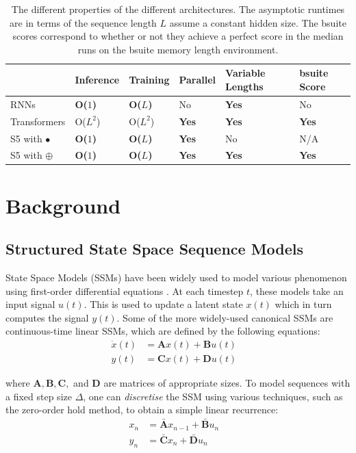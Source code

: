 \documentclass{article}
\newcommand{\oldop}{\bullet}
\newcommand{\newop}{\oplus}
\begin{document}
\begin{table}[t]
\centering
\begin{tabular}{l|lllll}
               & Inference     & Training      & Parallel     & Variable Lengths & bsuite Score \\ \hline
RNNs           & \textbf{O($1$)} & \textbf{O($L$)} & No           & \textbf{Yes}     & No           \\
Transformers   & O($L^2$)         & O($L^2$)         & \textbf{Yes} & \textbf{Yes}     & \textbf{Yes} \\
S5 with $\oldop$  & \textbf{O($1$)} & \textbf{O($L$)} & \textbf{Yes} & No               & N/A          \\
S5 with $\newop$ & \textbf{O($1$)} & \textbf{O($L$)} & \textbf{Yes} & \textbf{Yes}     & \textbf{Yes}
\end{tabular}
\vspace{1em}
\caption{The different properties of the different architectures. The asymptotic runtimes are in terms of the sequence length $L$ assume a constant hidden size. The bsuite scores correspond to whether or not they achieve a perfect score in the median runs on the bsuite memory length environment.}
\end{table}


\section{Background}
\label{sec:Background}

\subsection{Structured State Space Sequence Models}
\label{subsec:s4}

State Space Models (SSMs) have been widely used to model various phenomenon  using first-order differential equations \cite{hamilton1994state}. At each timestep $t$, these models take an input signal $u(t)$. This is used to update a latent state $x(t)$ which in turn computes the signal $y(t)$. Some of the more widely-used canonical SSMs are continuous-time linear SSMs, which are defined by the following equations:
\begin{align}
\dot{x}(t) &= \mathbf{A}x(t) + \mathbf{B}u(t)&\\
y(t) &= \mathbf{C}x(t) + \mathbf{D}u(t) \nonumber
\end{align}

where $\mathbf{A}, \mathbf{B}, \mathbf{C},$ and $\mathbf{D}$ are matrices of appropriate sizes. To model sequences with a fixed step size $\Delta$, one can \textit{discretise} the SSM using various techniques, such as the zero-order hold method, to obtain a simple linear recurrence:
\begin{align}
\label{eq:discretised-ssm}
x_n &= \mathbf{\bar{A}} x_{n-1} + \mathbf{\bar{B}} u_n&\\
y_n &= \mathbf{\bar{C}}x_{n} + \mathbf{\bar{D}}u_n \nonumber
\end{align}
\end{document}
